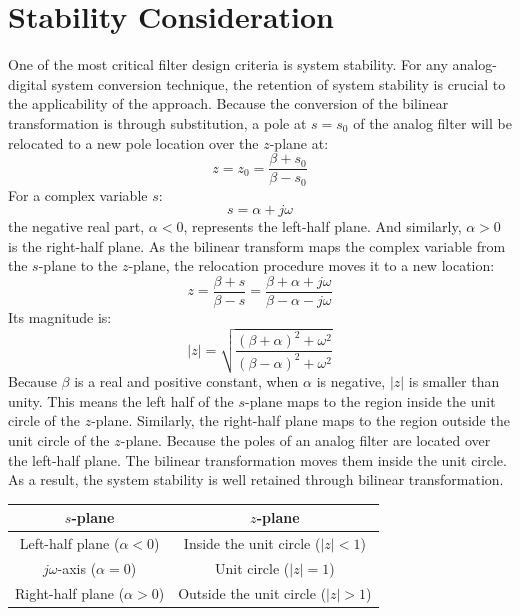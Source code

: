 \documentclass{article}
\begin{document}
\section{Stability Consideration}
One of the most critical filter design criteria is system stability. For any analog-digital system conversion technique, the retention of system stability is crucial to the applicability of the approach. Because the conversion of the bilinear transformation is through substitution, a pole at \(s=s_0\) of the analog filter will be relocated to a new pole location over the \(z\)-plane at:
\[
z=z_0=\frac{\beta+s_0}{\beta-s_0}
\]
For a complex variable \(s\):
\[
s=\alpha+j\omega
\]
the negative real part, \(\alpha<0\), represents the left-half plane. And similarly, \(\alpha>0\) is the right-half plane. As the bilinear transform maps the complex variable from the \(s\)-plane to the \(z\)-plane, the relocation procedure moves it to a new location:
\[
z=\frac{\beta+s}{\beta-s}=\frac{\beta+\alpha+j\omega}{\beta-\alpha-j\omega}
\]
Its magnitude is:
\[
|z|=\sqrt{\frac{(\beta+\alpha)^2+\omega^2}{(\beta-\alpha)^2+\omega^2}}
\]
Because \(\beta\) is a real and positive constant, when \(\alpha\) is negative, \(|z|\) is smaller than unity. This means the left half of the \(s\)-plane maps to the region inside the unit circle of the \(z\)-plane. Similarly, the right-half plane maps to the region outside the unit circle of the \(z\)-plane. Because the poles of an analog filter are located over the left-half plane. The bilinear transformation moves them inside the unit circle. As a result, the system stability is well retained through bilinear transformation.
\begin{table}[h]
\centering
\begin{tabular}{|c|c|}
\hline
\textbf{$s$-plane} & \textbf{$z$-plane} \\ \hline

Left-half plane ($\alpha < 0$) 
& 
Inside the unit circle ($|z| < 1$) 
\\ \hline

$j\omega$-axis ($\alpha = 0$) 
& 
Unit circle ($|z| = 1$) 
\\ \hline

Right-half plane ($\alpha > 0$) 
& 
Outside the unit circle ($|z| > 1$) 
\\ \hline

\end{tabular}
\end{table}
\end{document}
